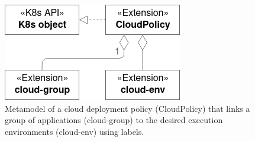 \documentclass[../main.tex]{subfiles}
\begin{document}
    \begin{figure}[h]
        \centering
        \includegraphics[width=.6\linewidth]{img/concepts_metamodel_policy_v3.png}
        \captionsetup{justification=centering}
        \caption{
            Metamodel of a \gls{cloud} deployment policy (CloudPolicy) that links a group of applications (cloud-group) to the desired execution environments (cloud-env) using labels.
        }
        \label{fig:policies_metamodel}
    \end{figure}
\end{document}
